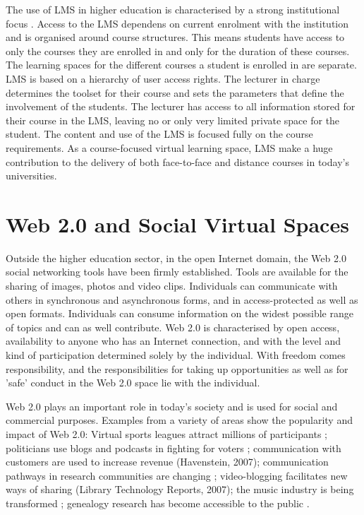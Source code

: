 The use of LMS in higher education is characterised by a strong institutional
focus \citep{Siemens2004}. Access to the LMS dependens on current enrolment
with the institution and is organised around course structures. This means
students have access to only the courses they are enrolled in and only for the
duration of these courses. The learning spaces for the different courses a
student is enrolled in are separate. LMS is based on a hierarchy of user access
rights. The lecturer in charge determines the toolset for their course and sets
the parameters that define the involvement of the students. The lecturer has
access to all information stored for their course in the LMS, leaving no or only
very limited private space for the student. The content and use of the LMS is
focused fully on the course requirements. As a course-focused virtual learning
space, LMS make a huge contribution to the delivery of both face-to-face and
distance courses in today's universities.

\section{Web 2.0 and Social Virtual Spaces}
Outside the higher education sector, in the open Internet domain, the Web 2.0
social networking tools have been firmly established. Tools are available for
the sharing of images, photos and video clips. Individuals can communicate with
others in synchronous and asynchronous forms, and in access-protected as well as
open formats. Individuals can consume information on the widest possible range
of topics and can as well contribute. Web 2.0 is characterised by open access,
availability to anyone who has an Internet connection, and with the level and
kind of participation determined solely by the individual. With freedom comes
responsibility, and the responsibilities for taking up opportunities as well as
for 'safe' conduct in the Web 2.0 space lie with the individual.

Web 2.0 plays an important role in today's society and is used for social and
commercial purposes. Examples from a variety of areas show the popularity and
impact of Web 2.0: Virtual sports leagues attract millions of participants
\citep{Holahan2006}; politicians use blogs and podcasts in fighting for
voters \citep{Capell2006}; communication with customers are used to increase
revenue (Havenstein, 2007); communication pathways in research communities are
changing \citep{Ashling2007}; video-blogging facilitates new ways of sharing
(Library Technology Reports, 2007); the music industry is being transformed
\citep{Holahan2007}; genealogy research has become accessible to the public
\citep{MacMillan2007}.

